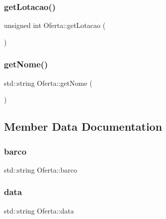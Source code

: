\mbox{\label{classOferta_a9c8fbec401e54e590828209931bf25b0}} 
\subsubsection{\texorpdfstring{get\+Lotacao()}{getLotacao()}}
{\footnotesize\ttfamily unsigned int Oferta\+::get\+Lotacao (\begin{DoxyParamCaption}{ }\end{DoxyParamCaption})\hspace{0.3cm}{\ttfamily [inline]}}

\mbox{\label{classOferta_a16da38d9f369b000cb544c34200707b8}} 
\subsubsection{\texorpdfstring{get\+Nome()}{getNome()}}
{\footnotesize\ttfamily std\+::string Oferta\+::get\+Nome (\begin{DoxyParamCaption}{ }\end{DoxyParamCaption})\hspace{0.3cm}{\ttfamily [inline]}}



\subsection{Member Data Documentation}
\mbox{\label{classOferta_ad41ed0bfb0e04d5f2f315fcd67350576}} 
\subsubsection{\texorpdfstring{barco}{barco}}
{\footnotesize\ttfamily std\+::string Oferta\+::barco\hspace{0.3cm}{\ttfamily [private]}}

\mbox{\label{classOferta_aa34296a79fd23afe52cd02916edf077b}} 
\subsubsection{\texorpdfstring{data}{data}}
{\footnotesize\ttfamily std\+::string Oferta\+::data\hspace{0.3cm}{\ttfamily [private]}}

